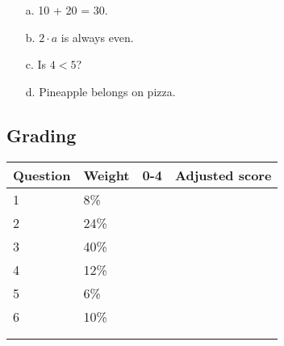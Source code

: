 \documentclass[a4paper,12pt]{book}
\begin{document}
    \begin{enumerate}
        \item[a.] 10 + 20 = 30.
            \iftoggle{answerkey}{ \begin{answer} Proposition, true \end{answer} }{}
        \item[b.] $2 \cdot a$ is always even.
            \iftoggle{answerkey}{ \begin{answer} Proposition, true \end{answer} }{}
        \item[c.] Is $4 < 5$?
            \iftoggle{answerkey}{ \begin{answer} Not a proposition \end{answer} }{}
        \item[d.] Pineapple belongs on pizza.
            \iftoggle{answerkey}{ \begin{answer} Proposition, true \end{answer} }{}
    \end{enumerate}



    \hrulefill

    \subsection*{Grading}

    \begin{center}

        \begin{tabular}{ | l | l | l | l | }
            \hline
            \textbf{ Question } & \textbf{ Weight } & \textbf{ 0-4 } & \textbf{ Adjusted score }
            \\ \hline{}

            1 & 8\% & &    \\ \hline
            2 & 24\% & &    \\ \hline
            3 & 40\% & &    \\ \hline
            4 & 12\% & &    \\ \hline
            5 & 6\% & &    \\ \hline
            6 & 10\% & &    \\ \hline
            & & & \\ \hline
            & & & \\ \hline


        \end{tabular}
    \end{center}
\end{document}
